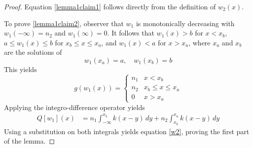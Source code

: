 \documentclass[11pt]{article}
\theoremstyle{definition}
\numberwithin{equation}{section}
\numberwithin{thm}{section}
\renewcommand{\a}{a}
\renewcommand{\b}{b}
\newcommand{\m}{n_1}
\newcommand{\mtwo}{n_2}
\begin{document}
\begin{proof}
Equation \ref{lemma1claim1} follows directly from the definition of $w_2(x)$.

To prove \ref{lemma1claim2}, observer that $w_1$ is monotonically decreasing with $w_1(-\infty)=\mtwo$ and $w_1(\infty)=0$. It follows that $w_1(x)>\b$ for $x<x_\b$, $\a\leq w_1(x)\leq\b$ for $x_\b\leq x\leq x_\a$, and $w_1(x)<\a$ for $x>x_\a$, where $x_a$ and $x_b$ are the solutions of
\begin{equation}
w_1(x_\a) = \a, \quad w_1(x_\b) = \b
\end{equation}
This yields
\begin{equation}
g(w_1(x)) = \begin{cases}
\m & x < x_\b \\
\mtwo & x_\b \leq x \leq x_\a \\
0 & x > x_\a
\end{cases}
\end{equation}
Applying the integro-difference operator yields
\begin{equation} \label{qw1calculation}
\begin{aligned}
Q[w_1](x) %
&= \m \int_{-\infty}^{x_\b} k(x-y) \, dy + \mtwo \int_{x_\b}^{x_\a} k(x-y) \, dy %
\end{aligned} \end{equation}
Using a substitution on both integrals yields equation \eqref{w2}, proving the first part of the lemma.




\end{proof}
\end{document}
